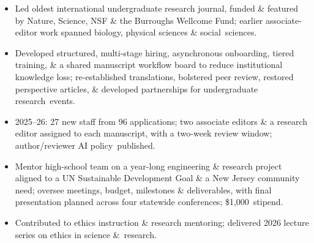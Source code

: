 \begin{itemize}
  \item Led oldest international undergraduate research journal, funded \& featured by Nature, Science, NSF \& the Burroughs Wellcome Fund; earlier associate-editor work spanned biology, physical sciences \& \cvkeep{}social~\cvlast{}sciences.\cvkeepend{}
  \item Developed structured, multi-stage hiring, asynchronous onboarding, tiered training, \& a shared manuscript workflow board to reduce institutional knowledge loss; re-established translations, bolstered peer review, restored perspective articles, \& developed partnerships for undergraduate \cvkeep{}research~\cvlast{}events.\cvkeepend{}
  \item 2025--26: 27 new staff from 96 applications; two associate editors \& a research editor assigned to each manuscript, with a two-week review window; author/reviewer AI \cvkeep{}policy~\cvlast{}published.\cvkeepend{}
\end{itemize}
\begin{itemize}
  \item Mentor high-school team on a year-long engineering \& research project aligned to a UN Sustainable Development Goal \& a New Jersey community need; oversee meetings, budget, milestones \& deliverables, with final presentation planned across four statewide conferences; \cvkeep{}\$1,000~\cvlast{}stipend.\cvkeepend{}
\end{itemize}
\begin{itemize}
  \item Contributed to ethics instruction \& research mentoring; delivered 2026 lecture series on ethics in science \cvkeep{}\&~\cvlast{}research.\cvkeepend{}
\end{itemize}
